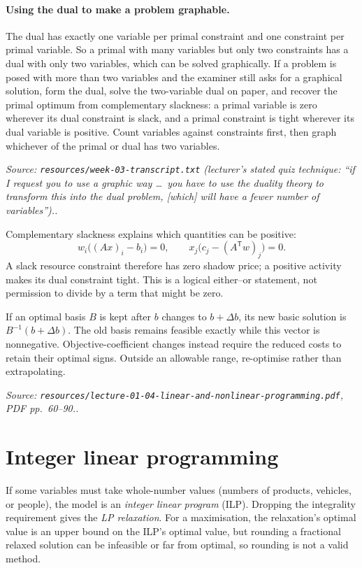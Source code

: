\documentclass[11pt,a4paper]{article}
\renewcommand{\texttt}[1]{\nolinkurl{#1}}
\newcommand{\T}{\mathsf{T}}
\newcommand{\source}[1]{\par\smallskip\noindent\textit{Source: #1.}\par\smallskip}
\begin{document}
\paragraph{Using the dual to make a problem graphable.} The dual has exactly one variable per primal constraint and one constraint per primal variable. So a primal with many variables but only two constraints has a dual with only two variables, which can be solved graphically. If a problem is posed with more than two variables and the examiner still asks for a graphical solution, form the dual, solve the two-variable dual on paper, and recover the primal optimum from complementary slackness: a primal variable is zero wherever its dual constraint is slack, and a primal constraint is tight wherever its dual variable is positive. Count variables against constraints first, then graph whichever of the primal or dual has two variables.
\source{\texttt{resources/week-03-transcript.txt} (lecturer's stated quiz technique: ``if I request you to use a graphic way \dots\ you have to use the duality theory to transform this into the dual problem, [which] will have a fewer number of variables'').}

Complementary slackness explains which quantities can be positive:
\[
 w_i\big((Ax)_i-b_i\big)=0,
 \qquad
 x_j\big(c_j-(A^\T w)_j\big)=0.
\]
A slack resource constraint therefore has zero shadow price; a positive activity makes its dual constraint tight. This is a logical either--or statement, not permission to divide by a term that might be zero.

If an optimal basis $B$ is kept after $b$ changes to $b+\Delta b$, its new basic solution is $B^{-1}(b+\Delta b)$. The old basis remains feasible exactly while this vector is nonnegative. Objective-coefficient changes instead require the reduced costs to retain their optimal signs. Outside an allowable range, re-optimise rather than extrapolating.
\source{\texttt{resources/lecture-01-04-linear-and-nonlinear-programming.pdf}, PDF pp.~60--90.}

\section{Integer linear programming}
If some variables must take whole-number values (numbers of products, vehicles, or people), the model is an \emph{integer linear program} (ILP). Dropping the integrality requirement gives the \emph{LP relaxation}. For a maximisation, the relaxation's optimal value is an upper bound on the ILP's optimal value, but rounding a fractional relaxed solution can be infeasible or far from optimal, so rounding is not a valid method.
\end{document}
